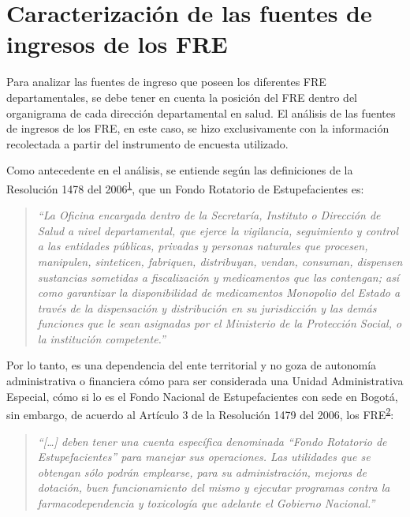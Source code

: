 \documentclass[
  oneside]{book}
\begin{document}
\hypertarget{caracterizaciuxf3n-de-las-fuentes-de-ingresos-de-los-fre}{%
\section{Caracterización de las fuentes de ingresos de los FRE}\label{caracterizaciuxf3n-de-las-fuentes-de-ingresos-de-los-fre}}

Para analizar las fuentes de ingreso que poseen los diferentes FRE departamentales, se debe tener en cuenta la posición del FRE dentro del organigrama de cada dirección departamental en salud. El análisis de las fuentes de ingresos de los FRE, en este caso, se hizo exclusivamente con la información recolectada a partir del instrumento de encuesta utilizado.

Como antecedente en el análisis, se entiende según las definiciones de la Resolución 1478 del 2006\textsuperscript{\protect\hyperlink{ref-MSPS1478-2006}{1}}, que un Fondo Rotatorio de Estupefacientes es:

\begin{quote}
\emph{``La Oficina encargada dentro de la Secretaría, Instituto o Dirección de Salud a nivel departamental, que ejerce la vigilancia, seguimiento y control a las entidades públicas, privadas y personas naturales que procesen, manipulen, sinteticen, fabriquen, distribuyan, vendan, consuman, dispensen sustancias sometidas a fiscalización y medicamentos que las contengan; así como garantizar la disponibilidad de medicamentos Monopolio del Estado a través de la dispensación y distribución en su jurisdicción y las demás funciones que le sean asignadas por el Ministerio de la Protección Social, o la institución competente.''}
\end{quote}

Por lo tanto, es una dependencia del ente territorial y no goza de autonomía administrativa o financiera cómo para ser considerada una Unidad Administrativa Especial, cómo si lo es el Fondo Nacional de Estupefacientes con sede en Bogotá, sin embargo, de acuerdo al Artículo 3 de la Resolución 1479 del 2006, los FRE\textsuperscript{\protect\hyperlink{ref-MSPS1479-2006}{2}}:

\begin{quote}
\emph{``{[}\ldots{]} deben tener una cuenta específica denominada ``Fondo Rotatorio de Estupefacientes'' para manejar sus operaciones. Las utilidades que se obtengan sólo podrán emplearse, para su administración, mejoras de dotación, buen funcionamiento del mismo y ejecutar programas contra la farmacodependencia y toxicología que adelante el Gobierno Nacional.''}
\end{quote}
\end{document}
